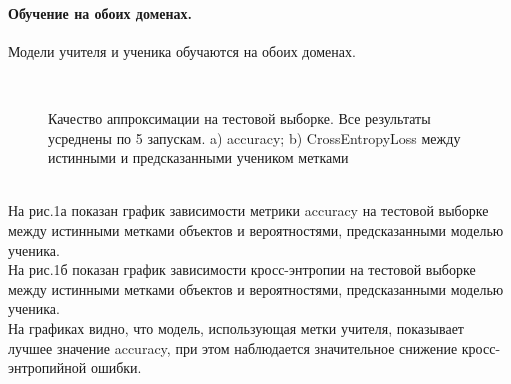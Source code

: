 \paragraph{Обучение на обоих доменах.}
Модели учителя и ученика обучаются на обоих доменах.\\
\begin{figure}[h!t]\center
{}
\\
\caption{Качество аппроксимации на тестовой выборке. Все результаты усреднены по 5 запускам. a) accuracy; b) CrossEntropyLoss между истинными и предсказанными учеником метками}
\end{figure}\\
На рис.1а показан график зависимости метрики accuracy на тестовой выборке между истинными метками объектов и вероятностями, предсказанными моделью ученика.\\
На рис.1б показан график зависимости кросс-энтропии на тестовой выборке между истинными метками объектов и вероятностями, предсказанными моделью ученика.\\
На графиках видно, что модель, использующая метки учителя, показывает лучшее значение accuracy, при этом наблюдается значительное снижение кросс-энтропийной ошибки.


